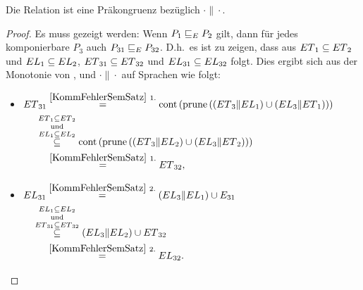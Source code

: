 \begin{Kor}
  \label{KommPraekonKor}
  Die Relation \ERel{} ist eine Präkongruenz bezüglich $\cdot\|\cdot$.
\end{Kor}
\begin{proof}
  Es muss gezeigt werden: Wenn $P_1 \sqsubseteq  _E P_2$ gilt, dann für jedes
  komponierbare $P_3$ auch $P_{31} \sqsubseteq  _E P_{32}$. D.h.\ es ist zu zeigen,
  dass aus $ET{}_1\subseteq ET{}_2$ und $EL{}_1\subseteq EL{}_2$,
  $ET{}_{31}\subseteq ET{}_{32}$ und $EL{}_{31}\subseteq
  EL{}_{32}$ folgt. Dies ergibt sich aus der Monotonie von \cont{},
  \prune{} und $\cdot \|\cdot$ auf Sprachen wie folgt:\\
  \begin{itemize}
    \item $\begin{aligned}[t]
        \ET{}_{31} &\overset{\ref{KommFehlerSemSatz}~1.}{=}
      \cont{}\left(\prune{}\left(\left(\ET{}_3\|\EL{}_1\right)\cup
          \left(\EL{}_3\|\ET{}_1\right)\right)\right)\\
      &\hspace{-0.4cm}\overset{\ET{}_1\subseteq
    \ET{}_2}{\overset{\mathrm{und}}{\overset{\EL{}_1\subseteq \EL{}_2}{\subseteq}}}
    \cont{}\left(\prune{}\left(\left(\ET{}_3\|\EL{}_2\right)\cup
        \left(\EL{}_3\|\ET{}_2\right)\right)\right)\\
    &\overset{\ref{KommFehlerSemSatz}~1.}{=} \ET{}_{32},
    \end{aligned}$
    \item $\begin{aligned}[t]
        \EL{}_{31} &\overset{\ref{KommFehlerSemSatz}~2.}{=}
        (\EL{}_3\|\EL{}_1)\cup E_{31}\\
        &\hspace{-0.5cm}\overset{\EL{}_1\subseteq
      \EL{}_2}{\overset{\mathrm{und}}{\overset{\ET{}_{31}\subseteq
      \ET{}_{32}}{\subseteq}}} (\EL{}_3\|\EL{}_2)\cup \ET{}_{32}\\
      &\overset{\ref{KommFehlerSemSatz}~2.}{=} \EL{}_{32}.
    \end{aligned}$
  \end{itemize}
\end{proof}

